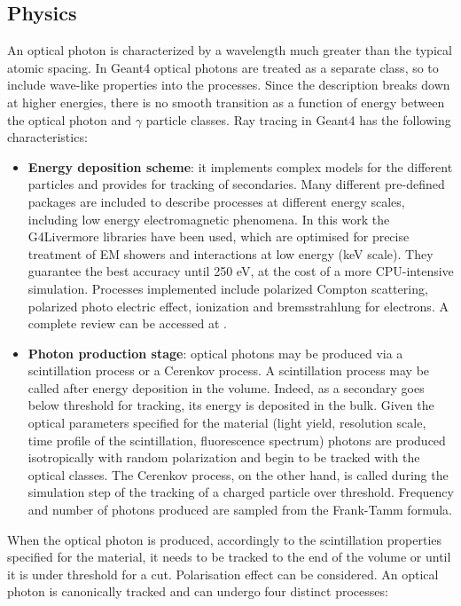 \subsection{Physics}
An optical photon is characterized by a wavelength much greater than the typical atomic spacing.
In Geant4 optical photons are treated as a separate class, so to include wave-like properties into the processes.
Since the description breaks down at higher energies, there is no smooth transition as a function of energy between the optical photon and $\gamma$ particle classes.
Ray tracing in Geant4 has the following characteristics:
\begin{itemize}
\item \textbf{Energy deposition scheme}: it implements complex models for the different particles and provides for tracking of secondaries. Many different pre-defined packages are included to describe processes at different energy scales, including low energy electromagnetic phenomena. 
In this work the G4Livermore libraries have been used, which are optimised for precise treatment of EM showers and interactions at low energy (keV scale). They guarantee the best accuracy until 250 eV, at the cost of a more CPU-intensive simulation. Processes implemented include polarized Compton scattering, polarized photo electric effect, ionization and bremsstrahlung for electrons. A complete review can be accessed at \cite{Sempau2002}.
\item \textbf{Photon production stage}: optical photons may be produced via a scintillation process or a Cerenkov process. 
A scintillation process may be called after energy deposition in the volume. Indeed, as a secondary goes below threshold for tracking, its energy is deposited in the bulk. Given the optical parameters specified for the material (light yield, resolution scale, time profile of the scintillation, fluorescence spectrum) photons are produced isotropically with random polarization and begin to be tracked with the optical classes.
The Cerenkov process, on the other hand, is called during the simulation step of the tracking of a charged particle over threshold. Frequency and number of photons produced are sampled from the Frank-Tamm formula.
\end{itemize}
When the optical photon is produced, accordingly to the scintillation properties specified for the material, it needs to be tracked to the end of the volume or until it is under threshold for a cut. Polarisation effect can be considered. An optical photon is canonically tracked and can undergo four distinct processes:
